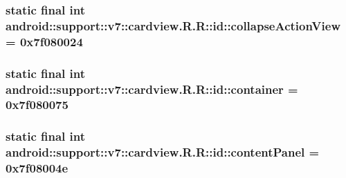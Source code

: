 \hypertarget{classandroid_1_1support_1_1v7_1_1cardview_1_1_r_1_1id_51107f6f5e146092b6bb2352db776f4c}{
\subsubsection[{collapseActionView}]{\setlength{\rightskip}{0pt plus 5cm}static final int android::support::v7::cardview.R.R::id::collapseActionView = 0x7f080024}}
\label{classandroid_1_1support_1_1v7_1_1cardview_1_1_r_1_1id_51107f6f5e146092b6bb2352db776f4c}


\hypertarget{classandroid_1_1support_1_1v7_1_1cardview_1_1_r_1_1id_a7462266a5ebc5f623983aabcf7e2aeb}{
\subsubsection[{container}]{\setlength{\rightskip}{0pt plus 5cm}static final int android::support::v7::cardview.R.R::id::container = 0x7f080075}}
\label{classandroid_1_1support_1_1v7_1_1cardview_1_1_r_1_1id_a7462266a5ebc5f623983aabcf7e2aeb}


\hypertarget{classandroid_1_1support_1_1v7_1_1cardview_1_1_r_1_1id_fb98339791a02449644314cc1fdf2133}{
\subsubsection[{contentPanel}]{\setlength{\rightskip}{0pt plus 5cm}static final int android::support::v7::cardview.R.R::id::contentPanel = 0x7f08004e}}
\label{classandroid_1_1support_1_1v7_1_1cardview_1_1_r_1_1id_fb98339791a02449644314cc1fdf2133}


